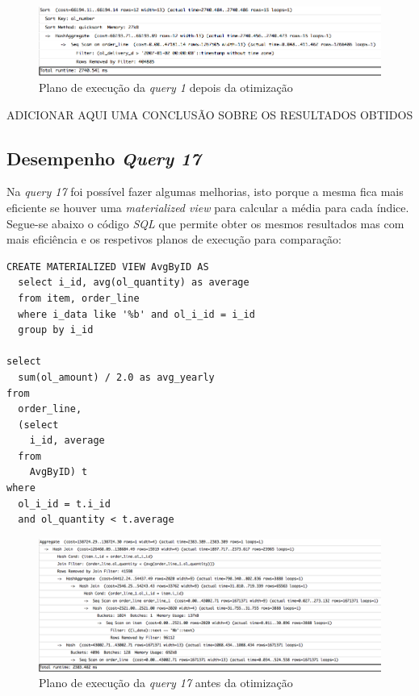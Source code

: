 \begin{figure}[ht!]
\centering
\includegraphics[width=\textwidth]{img/00_query1_pos}
\caption{Plano de execução da \textit{query 1} depois da otimização \label{overflow}}
\end{figure}

ADICIONAR AQUI UMA CONCLUSÃO SOBRE OS RESULTADOS OBTIDOS

\newpage

\subsection{Desempenho \textit{Query 17}}

Na \textit{query 17} foi possível fazer algumas melhorias, isto porque a mesma fica mais eficiente se houver uma \textit{materialized view} para calcular a média para cada índice. Segue-se abaixo o código \textit{SQL} que permite obter os mesmos resultados mas com mais eficiência e os respetivos planos de execução para comparação:

\begin{verbatim}
CREATE MATERIALIZED VIEW AvgByID AS
  select i_id, avg(ol_quantity) as average
  from item, order_line
  where i_data like '%b' and ol_i_id = i_id
  group by i_id

select
  sum(ol_amount) / 2.0 as avg_yearly
from
  order_line,
  (select
    i_id, average
  from
    AvgByID) t
where
  ol_i_id = t.i_id
  and ol_quantity < t.average
\end{verbatim}

\begin{figure}[ht!]
\centering
\includegraphics[width=\textwidth]{img/00_query17_ant}
\caption{Plano de execução da \textit{query 17} antes da otimização \label{overflow}}
\end{figure}

